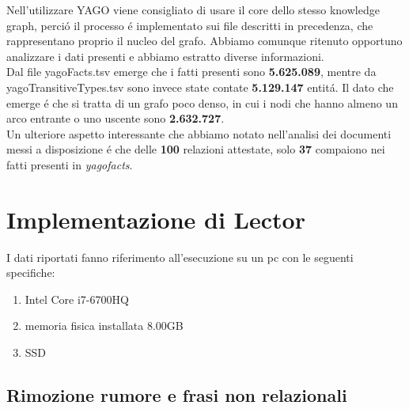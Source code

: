 \documentclass[twocolumn,10pt]{asme2ej}
\begin{document}

Nell'utilizzare YAGO viene consigliato di usare il core dello stesso knowledge graph, perci\'o il processo \'e implementato sui file descritti in precedenza, che rappresentano proprio il nucleo del grafo. Abbiamo comunque ritenuto opportuno analizzare i dati presenti e abbiamo estratto diverse  informazioni. \\Dal file yagoFacts.tsv emerge che i fatti presenti sono \textbf{5.625.089}, mentre da yagoTransitiveTypes.tsv sono invece state contate \textbf{5.129.147} entit\'a. Il dato che emerge \'e che si tratta di un grafo poco denso, in cui i nodi che hanno almeno un arco entrante o uno uscente sono \textbf{2.632.727}.
\\ Un ulteriore aspetto interessante che abbiamo notato nell'analisi dei documenti messi a disposizione \'e che delle \textbf{100} relazioni attestate, solo \textbf{37} compaiono nei fatti presenti in \textit{yagofacts}.
\section{Implementazione di Lector}

I dati riportati fanno riferimento all'esecuzione su un pc con le seguenti specifiche:
\begin{enumerate}
\item Intel Core i7-6700HQ
\item memoria fisica installata 8.00GB
\item SSD
\end{enumerate}


\subsection{Rimozione rumore e frasi non relazionali}
\end{document}
